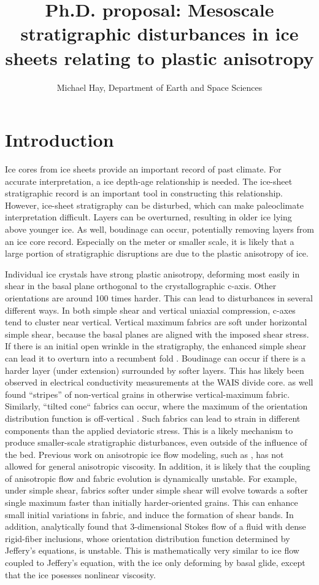 \documentclass{article}
\author{Michael Hay, Department of Earth and Space Sciences}
\begin{document}
\title{Ph.D. proposal: Mesoscale stratigraphic disturbances in ice sheets relating to plastic anisotropy}
\maketitle
\section{Introduction}
Ice cores from ice sheets provide an important record of past climate.  For accurate interpretation, a ice depth-age relationship is needed. The ice-sheet stratigraphic record is an important tool in constructing this relationship. However, ice-sheet stratigraphy can be disturbed, which can make paleoclimate interpretation difficult. Layers can be overturned, resulting in older ice lying above younger ice. As well, boudinage can occur, potentially removing layers from an ice core record. Especially on the meter or smaller scale, it is likely that a large portion of stratigraphic disruptions are due to the plastic anisotropy of ice.

Individual ice crystals have strong plastic anisotropy, deforming most easily in shear in the basal plane orthogonal to the crystallographic c-axis. Other orientations are around 100 times harder. This can lead to disturbances in several different ways. In both simple shear and vertical uniaxial compression, c-axes tend to cluster near vertical. Vertical maximum fabrics are soft under horizontal simple shear, because the basal planes are aligned with the imposed shear stress. If there is an initial open wrinkle in the stratigraphy, the enhanced simple shear can lead it to overturn into a recumbent fold \citep{throstur2002}. Boudinage can occur if there is a harder layer (under extension) surrounded by softer layers. This has likely been observed in electrical conductivity measurements at the WAIS divide core. \citet{alley97} as well found ``stripes'' of non-vertical grains in otherwise vertical-maximum fabric. Similarly, ``tilted cone`` fabrics can occur, where the maximum of the orientation distribution function is off-vertical \citep{throstur2002}. Such fabrics can lead to strain in different components than the applied deviatoric stress. This is a likely mechanism to produce smaller-scale stratigraphic disturbances, even outside of the influence of the bed. Previous work on anisotropic ice flow modeling, such as \citet{gillet2005}, has not allowed for general anisotropic viscosity. In addition, it is likely that the coupling of anisotropic flow and fabric evolution is dynamically unstable. For example, under simple shear, fabrics softer under simple shear will evolve towards a softer single maximum faster than initially harder-oriented grains. This can enhance small initial variations in fabric, and induce the formation of shear bands. In addition, \citet{montgomery-smith2011} analytically found that 3-dimensional Stokes flow of a fluid with dense rigid-fiber inclusions, whose orientation distribution function determined by Jeffery's equations, is unstable. This is mathematically very similar to ice flow coupled to Jeffery's equation, with the ice only deforming by basal glide, except that the ice posesses nonlinear viscosity.
\end{document}
